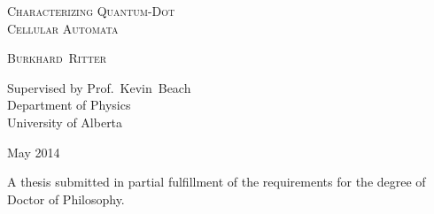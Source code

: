 \begin{titlepage}
\begin{center}
    \large  

    \hfill
    \vfill

    \begingroup
        \textsc{\huge Characterizing Quantum-Dot\\Cellular Automata} \\ \bigskip
    \endgroup

    \textsc{\Large Burkhard~Ritter}

    \vfill

    Supervised by Prof.~Kevin~Beach \\
    Department of Physics\\
    University of Alberta \\ \bigskip

    May 2014

    \vfill
    \vspace*{1cm}
    
    \small{A thesis submitted in partial fulfillment of the requirements for
    the degree of Doctor of Philosophy.}
\end{center}  
\end{titlepage}   


